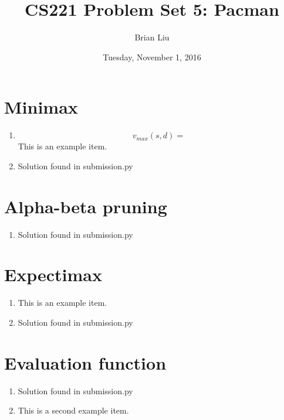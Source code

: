 \documentclass{article}
\title{CS221 Problem Set 5: Pacman}
\author{Brian Liu}
\date{Tuesday, November 1, 2016}
\begin{document}
\maketitle

\section{Minimax}
\begin{enumerate}
    \item
    \begin{equation}
    v_{max}(s,d) = 
    \end{equation}
    This is an example item.
    \item
    Solution found in submission.py

\end{enumerate}

\section{Alpha-beta pruning}
\begin{enumerate}
    \item
    Solution found in submission.py

\end{enumerate}

\section{Expectimax}
\begin{enumerate}
    \item
    This is an example item.
    \item
    Solution found in submission.py

\end{enumerate}

\section{Evaluation function}
\begin{enumerate}
    \item
    Solution found in submission.py
    \item
    This is a second example item.

\end{enumerate}
\end{document}
